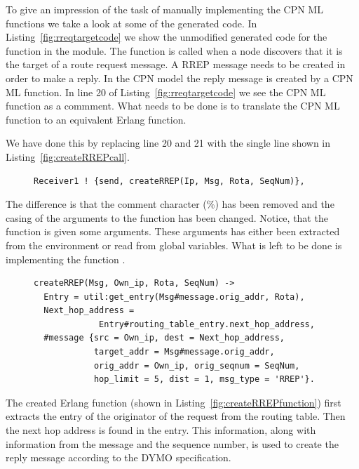 To give an impression of the task of manually implementing the CPN ML functions we take a look at some of the generated code. In Listing~\ref{fig:rreqtargetcode} we show the unmodified generated code for the  function in the  module. The  function is called when a node discovers that it is the target of a route request message. A RREP message needs to be created in order to make a reply. In the CPN model the reply message is created by a CPN ML function. In line 20 of Listing~\ref{fig:rreqtargetcode} we see the CPN ML function  as a commment. What needs to be done is to translate the CPN ML function  to an equivalent Erlang function.

We have done this by replacing line 20 and 21 with the single line shown in Listing~\ref{fig:createRREPcall}.

\begin{figure}[h!]
\begin{verbatim}
Receiver1 ! {send, createRREP(Ip, Msg, Rota, SeqNum)},
\end{verbatim}
\end{figure}

The difference is that the comment character (\%) has been removed and the casing of the arguments to the function has been changed. Notice, that the function  is given some arguments. These arguments has either been extracted from the environment or read from global variables. What is left to be done is implementing the function .

\begin{figure}[h!]
\begin{verbatim}
createRREP(Msg, Own_ip, Rota, SeqNum) ->
  Entry = util:get_entry(Msg#message.orig_addr, Rota),
  Next_hop_address =
             Entry#routing_table_entry.next_hop_address,
  #message {src = Own_ip, dest = Next_hop_address,
            target_addr = Msg#message.orig_addr, 
            orig_addr = Own_ip, orig_seqnum = SeqNum, 
            hop_limit = 5, dist = 1, msg_type = 'RREP'}.
\end{verbatim}
\end{figure}

The created Erlang function  (shown in Listing~\ref{fig:createRREPfunction}) first extracts the entry of the originator of the request from the routing table. Then the next hop address is found in the entry. This information, along with information from the message and the sequence number, is used to create the reply message according to the DYMO specification.

